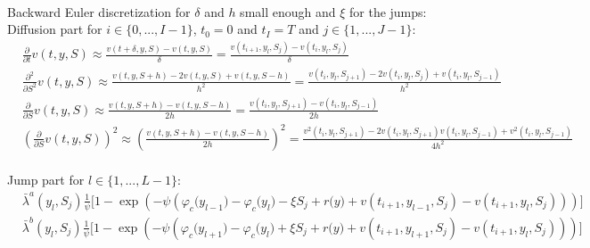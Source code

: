\documentclass[8pt]{article}
\begin{document}
\\

Backward Euler discretization for $\delta$ and $h$ small enough and $\xi$ for the jumps:\\

Diffusion part for $i \in \{0,...,I-1\}$, $t_0=0$ and $t_I=T$ and $j \in \{1,...,J-1\}$:\\

$\begin{aligned}
&\frac{\partial}{\partial t} v(t, y, S) \approx \frac{v(t + \delta,y,S) - v(t,y,S)}{\delta} = \frac{v(t_{i+1},y_l,S_j) - v(t_{i},y_l,S_j)}{\delta} \\
&\frac{\partial^2}{\partial S^2} v(t, y, S) \approx \frac{v(t,y,S+h) - 2v(t,y,S) + v(t,y,S-h)}{h^2} = \frac{v(t_{i},y_l,S_{j+1}) - 2v(t_{i},y_l,S_j) + v(t_{i},y_l,S_{j-1})}{h^2} \\
&\frac{\partial}{\partial S} v(t,y,S) \approx \frac{v(t,y,S+h) - v(t,y,S-h)}{2h} = \frac{v(t_i,y_l,S_{j+1}) - v(t_i,y_l,S_{j-1})}{2h} \, \\
&\left(\frac{\partial}{\partial S} v(t,y,S)\right)^2 \approx \left(\frac{v(t,y,S+h) - v(t,y,S-h)}{2h}\right)^2 = \frac{v^2(t_i,y_l,S_{j+1}) - 2v(t_i,y_l,S_{j+1})v(t_i,y_l,S_{j-1}) + v^2(t_i,y_l,S_{j-1})}{4h^2}
\end{aligned}$\\ \\

Jump part for $l \in \{1,...,L-1\}$:\\

$\begin{aligned}
&\bar{\lambda}^a(y_l, S_j) \frac{1}{\psi} \big[ 1 - \exp \left(-\psi \left(\varphi_c \big(y_{l-1} \big) - \varphi_c \big(y_l \big) - \xi S_j + r \big(y \big) + v(t_{i+1}, y_{l-1}, S_j) - v(t_{i+1}, y_l, S_j) \right)\right) \big] \\
&\bar{\lambda}^b(y_l, S_j) \frac{1}{\psi} \big[ 1 - \exp \left(-\psi \left(\varphi_c \big(y_{l+1} \big) - \varphi_c \big(y_l \big) + \xi S_j + r \big(y \big) + v(t_{i+1}, y_{l+1}, S_j) - v(t_{i+1}, y_l, S_j) \right)\right) \big]
\end{aligned}$ \\
\end{document}
